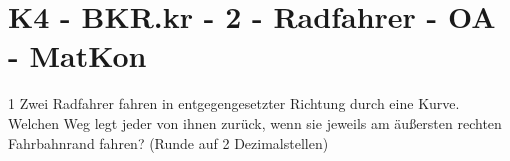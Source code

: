 \section{K4 - BKR.kr - 2 - Radfahrer - OA - MatKon}

\begin{langesbeispiel} \item[1] %
Zwei Radfahrer fahren in entgegengesetzter Richtung durch eine Kurve. Welchen Weg legt jeder von ihnen zurück, wenn sie jeweils am äußersten rechten Fahrbahnrand fahren? (Runde auf 2 Dezimalstellen)

				
\end{langesbeispiel}